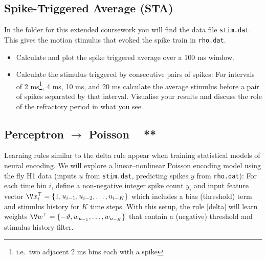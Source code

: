 \documentclass[11pt]{article}
\begin{document}
\subsection{Spike-Triggered Average (STA) ~ \normalfont [5 marks]}
\label{staq}
In the folder for this extended coursework you will find the data file \texttt{stim.dat}. This gives the motion stimulus that evoked the spike train in \texttt{rho.dat}.
\begin{itemize}
\item[\textbf{(i)}] 
Calculate and plot the spike triggered average over a 100 ms window. 
\item[\textbf{(ii)}]
Calculate the stimulus triggered by consecutive pairs of spikes: For intervals of 2 ms\footnote{i.e.\ two adjacent 2 ms bins each with a spike}, 4 ms, 10 ms, and 20 ms calculate the average stimulus before a pair of spikes separated by that interval. Visualise your results and discuss the role of the refractory period in what you see. 
\end{itemize}


\subsection{Perceptron $\to$ Poisson ~ **}

\newcommand{\eps}{\varepsilon}
Learning rules similar to the delta rule appear when training statistical models of neural encoding. We will explore a linear--nonlinear Poisson encoding model using the fly H1 data (inputs $u$ from \texttt{stim.dat}, predicting spikes $y$ from \texttt{rho.dat}):
\lequation{delta}{
\Delta \V w &= \eta\cdot \V x \V\eps \\
\eps &= y^* - \lambda \\
\lambda &= \exp( \V w^\top \V x).\\
}
For each time bin $i$, define a non-negative integer spike count $y_i$ and input feature vector $\V x_i^\top = \{ 1, u_{i-1}, u_{i-2}, \dots, u_{i-K}\}$ which includes a bias (threshold) term and stimulus history for $K$ time steps. With this setup, the rule \eqref{delta} will learn weights $\V w^\top = \{ -\vartheta, w_{u_{-1}}, \dots, w_{u_{-K}} \}$ that contain a (negative) threshold and stimulus history filter. 
\end{document}
